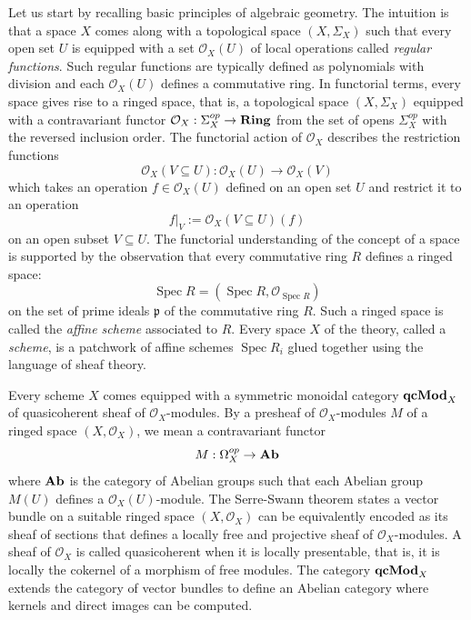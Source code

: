 \documentclass[8pt]{article}
\theoremstyle{definition}
\theoremstyle{definition}
\theoremstyle{definition}
\theoremstyle{definition}
\theoremstyle{definition}
\theoremstyle{definition}
\theoremstyle{definition}
\theoremstyle{definition}
\theoremstyle{definition}
\theoremstyle{definition}
\theoremstyle{definition}
\theoremstyle{definition}
\theoremstyle{definition}
\theoremstyle{definition}
\theoremstyle{question}
\begin{document}
Let us start by recalling basic principles of algebraic geometry. The intuition is that a space $X$ comes along with a topological space
$(X,\Sigma_X)$ such that every open set $U$ is equipped with a set $\mathcal{O}_X(U)$ of local operations called \emph{regular functions}. 
Such regular functions are typically defined as polynomials with division and each  $\mathcal{O}_X(U)$ defines a commutative ring.
In functorial terms, every space gives rise to a ringed space, that is, a topological space $(X, \Sigma_X)$ equipped with a contravariant functor
$\mathcal{O}_X : \Sigma^{op}_X \to {\bf Ring}$ from the set of opens $\Sigma^{op}_X$ with the reversed inclusion order. The functorial action
of $\mathcal{O}_X$ describes the restriction functions 
\[
\mathcal{O}_X(V \subseteq U) : \mathcal{O}_X(U) \to \mathcal{O}_X(V)
\]
which takes an operation $f \in \mathcal{O}_X(U)$ defined on an open set $U$ and restrict it to an operation
\[
f|_V := \mathcal{O}_X(V \subseteq U)(f)
\]
on an open subset $V \subseteq U$. The functorial understanding of the concept of a space is supported by the observation
that every commutative ring $R$ defines a ringed space:
\[
\operatorname{Spec}R = (\operatorname{Spec}R, \mathcal{O}_{\operatorname{Spec}R})
\]
on the set of prime ideals $\mathfrak{p}$ of the commutative ring $R$. Such a ringed space is called the \emph{affine scheme} associated to $R$.
Every space $X$ of the theory, called a \emph{scheme}, is a patchwork of affine schemes $\operatorname{Spec}R_i$ glued together using the language of sheaf theory. 

Every scheme $X$ comes equipped with a symmetric monoidal category ${\bf qcMod}_X$ of quasicoherent sheaf of $\mathcal{O}_X$-modules.
By a presheaf of $\mathcal{O}_X$-modules $M$ of a ringed space $(X, \mathcal{O}_X)$, we mean a contravariant functor
\[
M : \Omega^{op}_X \to {\bf Ab}
\]
where ${\bf Ab}$ is the category of Abelian groups such that each Abelian group $M(U)$ defines a $\mathcal{O}_X(U)$-module.
The Serre-Swann theorem states a vector bundle on a suitable ringed space $(X, \mathcal{O}_X)$ can be equivalently encoded as its sheaf of sections
that defines a locally free and projective sheaf of $\mathcal{O}_X$-modules. A sheaf of $\mathcal{O}_X$ is called quasicoherent
when it is locally presentable, that is, it is locally the cokernel of a morphism of free modules. The category ${\bf qcMod}_X$ extends 
the category of vector bundles to define an Abelian category where kernels and direct images can be computed.
\end{document}
